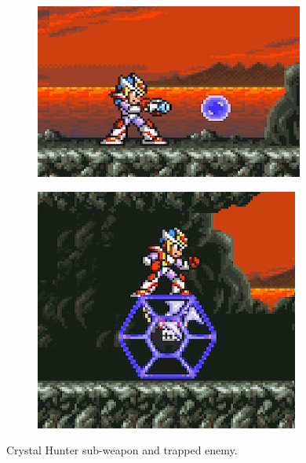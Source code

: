 \begin{figure}[htp]
	\centering
	\begin{subfigure}{0.39\linewidth}
		\includegraphics[width=\linewidth]{figures/X2/weapons/C_Hunter_1.png}	
	\end{subfigure}
	\begin{subfigure}{0.275\linewidth}
		\includegraphics[width=\linewidth]{figures/X2/weapons/C_Hunter_2.png}	
	\end{subfigure}
	\caption{Crystal Hunter sub-weapon and trapped enemy.}
\end{figure}

